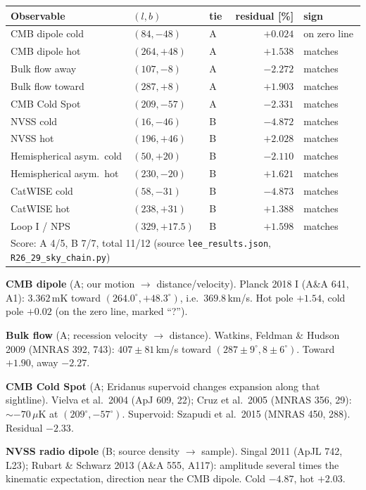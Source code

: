 \documentclass[11pt]{article}
\begin{document}
\begin{table}[H]\centering\small
\begin{tabular}{lllrl}\toprule
Observable & $(l,b)$ & tie & residual [\%] & sign\\\midrule
CMB dipole cold & $(84,-48)$ & A & $+0.024$ & on zero line\\
CMB dipole hot & $(264,+48)$ & A & $+1.538$ & matches\\
Bulk flow away & $(107,-8)$ & A & $-2.272$ & matches\\
Bulk flow toward & $(287,+8)$ & A & $+1.903$ & matches\\
CMB Cold Spot & $(209,-57)$ & A & $-2.331$ & matches\\
NVSS cold & $(16,-46)$ & B & $-4.872$ & matches\\
NVSS hot & $(196,+46)$ & B & $+2.028$ & matches\\
Hemispherical asym.\ cold & $(50,+20)$ & B & $-2.110$ & matches\\
Hemispherical asym.\ hot & $(230,-20)$ & B & $+1.621$ & matches\\
CatWISE cold & $(58,-31)$ & B & $-4.873$ & matches\\
CatWISE hot & $(238,+31)$ & B & $+1.388$ & matches\\
Loop I / NPS & $(329,+17.5)$ & B & $+1.598$ & matches\\\midrule
\multicolumn{5}{l}{Score: A 4/5, B 7/7, total 11/12 (source \texttt{lee\_results.json}, \texttt{R26\_29\_sky\_chain.py})}\\\bottomrule
\end{tabular}\end{table}

\textbf{CMB dipole} (A; our motion $\to$ distance/velocity). Planck 2018 I (A\&A 641, A1): $3.362$\,mK toward $(264.0^\circ,+48.3^\circ)$, i.e.\ $369.8$\,km/s. Hot pole $+1.54$, cold pole $+0.02$ (on the zero line, marked ``?'').

\textbf{Bulk flow} (A; recession velocity $\to$ distance). Watkins, Feldman \& Hudson 2009 (MNRAS 392, 743): $407\pm81$\,km/s toward $(287\pm9^\circ, 8\pm6^\circ)$. Toward $+1.90$, away $-2.27$.

\textbf{CMB Cold Spot} (A; Eridanus supervoid changes expansion along that sightline). Vielva et al.\ 2004 (ApJ 609, 22); Cruz et al.\ 2005 (MNRAS 356, 29): $\sim -70\,\mu$K at $(209^\circ,-57^\circ)$. Supervoid: Szapudi et al.\ 2015 (MNRAS 450, 288). Residual $-2.33$.

\textbf{NVSS radio dipole} (B; source density $\to$ sample). Singal 2011 (ApJL 742, L23); Rubart \& Schwarz 2013 (A\&A 555, A117): amplitude several times the kinematic expectation, direction near the CMB dipole. Cold $-4.87$, hot $+2.03$.
\end{document}
